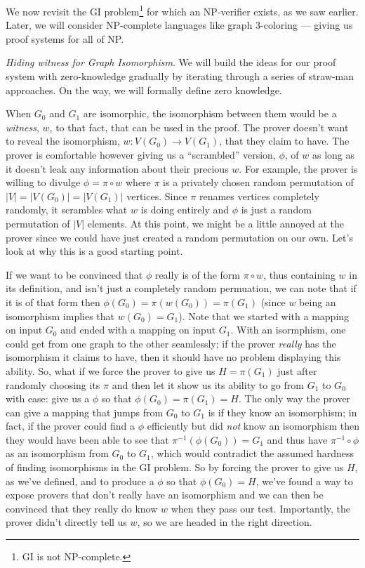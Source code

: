 	We now revisit the GI problem\footnote{GI is not NP-complete.} for which an NP-verifier exists, as we saw earlier. Later, we will consider NP-complete languages like graph 3-coloring --- giving us proof systems for all of NP. \smallskip

	\noindent \textit{Hiding witness for Graph Isomorphism}. We will build the ideas for our proof system with zero-knowledge gradually by iterating through a series of straw-man approaches. On the way, we will formally define zero knowledge. 

	When $G_0$ and $G_1$ are isomorphic, the isomorphism between them would be a \textit{witness}, $w$, to that fact, that can be used in the proof.  The prover doesn't want to reveal the isomorphism, $w:V(G_0)\rightarrow V(G_1)$, that they claim to have.  The prover is comfortable however giving us a ``scrambled'' version, $\phi$, of $w$ as long as it doesn't leak any information about their precious $w$.  For example, the prover is willing to divulge $\phi = \pi \circ w$ where $\pi$ is a privately chosen random permutation of $|V|=|V(G_0)|=|V(G_1)|$ vertices.  Since $\pi$ renames vertices completely randomly, it scrambles what $w$ is doing entirely and $\phi$ is just a random permutation of $|V|$ elements.  At this point, we might be a little annoyed at the prover since we could have just created a random permutation on our own.  Let's look at why this is a good starting point.
		
	If we want to be convinced that $\phi$ really is of the form $\pi \circ w$, thus containing $w$ in its definition, and isn't just a completely random permuation, we can note that if it is of that form then $\phi(G_0)=\pi(w(G_0))=\pi(G_1)$ (since $w$ being an isomorphism implies that $w(G_0)=G_1$).  Note that we started with a mapping on input $G_0$ and ended with a mapping on input $G_1$.  With an isormphism, one could get from one graph to the other seamlessly; if the prover \textit{really} has the isomorphism it claims to have, then it should have no problem displaying this ability.  So, what if we force the prover to give us $H=\pi (G_1)$ just after randomly choosing its $\pi$ and then let it show us its ability to go from $G_1$ to $G_0$ with ease: give us a $\phi$ so that $\phi(G_0)=\pi(G_1)=H$.  The only way the prover can give a mapping that jumps from $G_0$ to $G_1$ is if they know an isomorphism; in fact, if the prover could find a $\phi$ efficiently but did \textit{not} know an isomorphism then they would have been able to see that $\pi^{-1}(\phi(G_0))=G_1$ and thus have $\pi^{-1}\circ\phi$ as an isomorphism from $G_0$ to $G_1$, which would contradict the assumed hardness of finding isomorphisms in the GI problem. So by forcing the prover to give us $H$, as we've defined, and to produce a $\phi$ so that $\phi(G_0)=H$, we've found a way to expose provers that don't really have an isomorphism and we can then be convinced that they really do know $w$ when they pass our test.  Importantly, the prover didn't directly tell us $w$, so we are headed in the right direction.
		
